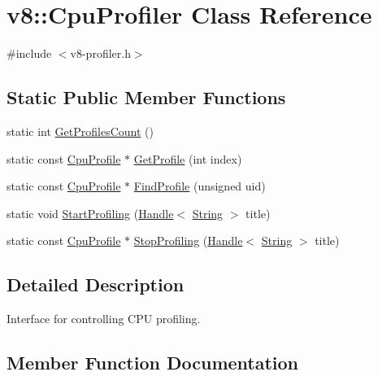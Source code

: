 \hypertarget{classv8_1_1_cpu_profiler}{}\section{v8\+:\+:Cpu\+Profiler Class Reference}
\label{classv8_1_1_cpu_profiler}


{\ttfamily \#include $<$v8-\/profiler.\+h$>$}

\subsection*{Static Public Member Functions}
\begin{DoxyCompactItemize}
\item 
static int \hyperlink{classv8_1_1_cpu_profiler_a44a4ffe2e95237dfeb892972d14d344e}{Get\+Profiles\+Count} ()
\item 
static const \hyperlink{classv8_1_1_cpu_profile}{Cpu\+Profile} $\ast$ \hyperlink{classv8_1_1_cpu_profiler_a4f4ba3e5e1775ce34dca0d766c355c3e}{Get\+Profile} (int index)
\item 
static const \hyperlink{classv8_1_1_cpu_profile}{Cpu\+Profile} $\ast$ \hyperlink{classv8_1_1_cpu_profiler_a9980775a03b2d5d8b4d23db58481975c}{Find\+Profile} (unsigned uid)
\item 
static void \hyperlink{classv8_1_1_cpu_profiler_a04c07069ea985ee67a9bcd7a97ab17fc}{Start\+Profiling} (\hyperlink{classv8_1_1_handle}{Handle}$<$ \hyperlink{classv8_1_1_string}{String} $>$ title)
\item 
static const \hyperlink{classv8_1_1_cpu_profile}{Cpu\+Profile} $\ast$ \hyperlink{classv8_1_1_cpu_profiler_a7c0866270ff1cc8aa4e832c9115872c5}{Stop\+Profiling} (\hyperlink{classv8_1_1_handle}{Handle}$<$ \hyperlink{classv8_1_1_string}{String} $>$ title)
\end{DoxyCompactItemize}


\subsection{Detailed Description}
Interface for controlling C\+P\+U profiling. 

\subsection{Member Function Documentation}
\hypertarget{classv8_1_1_cpu_profiler_a9980775a03b2d5d8b4d23db58481975c}{}

